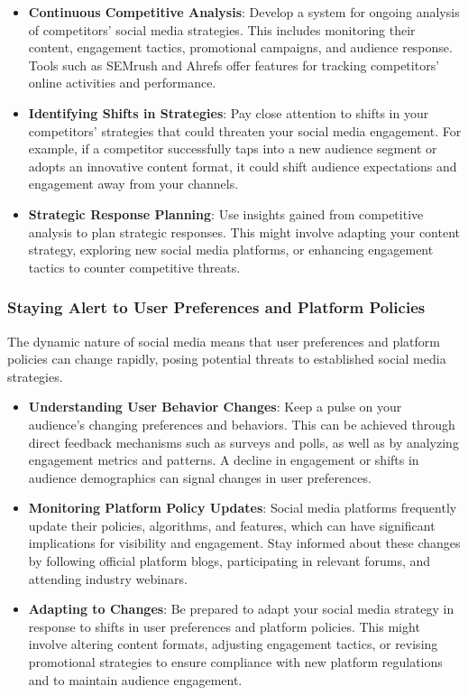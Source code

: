 \documentclass[
]{book}
\providecommand{\tightlist}{%
  \setlength{\itemsep}{0pt}\setlength{\parskip}{0pt}}
\begin{document}
\begin{itemize}
\tightlist
\item
  \textbf{Continuous Competitive Analysis}: Develop a system for ongoing analysis of competitors' social media strategies. This includes monitoring their content, engagement tactics, promotional campaigns, and audience response. Tools such as SEMrush and Ahrefs offer features for tracking competitors' online activities and performance.
\item
  \textbf{Identifying Shifts in Strategies}: Pay close attention to shifts in your competitors' strategies that could threaten your social media engagement. For example, if a competitor successfully taps into a new audience segment or adopts an innovative content format, it could shift audience expectations and engagement away from your channels.
\item
  \textbf{Strategic Response Planning}: Use insights gained from competitive analysis to plan strategic responses. This might involve adapting your content strategy, exploring new social media platforms, or enhancing engagement tactics to counter competitive threats.
\end{itemize}

\hypertarget{staying-alert-to-user-preferences-and-platform-policies}{%
\subsubsection*{Staying Alert to User Preferences and Platform Policies}\label{staying-alert-to-user-preferences-and-platform-policies}}

The dynamic nature of social media means that user preferences and platform policies can change rapidly, posing potential threats to established social media strategies.

\begin{itemize}
\tightlist
\item
  \textbf{Understanding User Behavior Changes}: Keep a pulse on your audience's changing preferences and behaviors. This can be achieved through direct feedback mechanisms such as surveys and polls, as well as by analyzing engagement metrics and patterns. A decline in engagement or shifts in audience demographics can signal changes in user preferences.
\item
  \textbf{Monitoring Platform Policy Updates}: Social media platforms frequently update their policies, algorithms, and features, which can have significant implications for visibility and engagement. Stay informed about these changes by following official platform blogs, participating in relevant forums, and attending industry webinars.
\item
  \textbf{Adapting to Changes}: Be prepared to adapt your social media strategy in response to shifts in user preferences and platform policies. This might involve altering content formats, adjusting engagement tactics, or revising promotional strategies to ensure compliance with new platform regulations and to maintain audience engagement.
\end{itemize}
\end{document}
